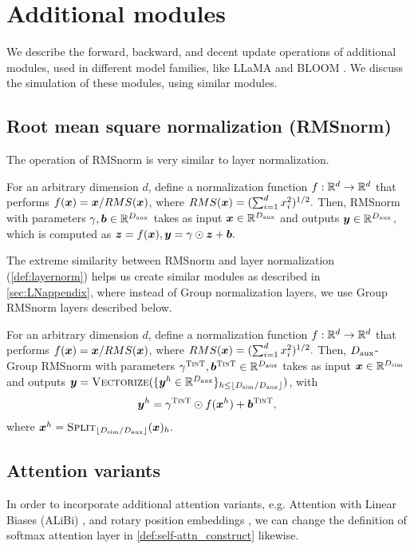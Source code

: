 \section{Additional modules}\label{sec:additional_modules}
We describe the forward, backward, and decent update operations of additional modules, used in different model families, like LLaMA \cite{touvron2023llama} and BLOOM \cite{scao2022bloom}. We discuss the simulation of these modules, using similar \simulator{} modules.


\subsection{Root mean square normalization (RMSnorm)} 
The operation of RMSnorm \cite{zhang2019root} is very similar to layer normalization.
\begin{definition}[RMSnorm]\label{def:rmsnorm}
    For an arbitrary dimension $d$, define a normalization function $f:\mathbb{R}^d\to\mathbb{R}^d$ that performs $f({\bm{x}}) = {\bm{x}} / RMS({\bm{x}})$, where $RMS({\bm{x}}) = (\sum_{i=1}^{d} x_i^2)^{1/2}.$ Then, RMSnorm with parameters $\mathbf{\gamma}, {\bm{b}} \in \mathbb{R}^{D_{\text{aux}}}$ takes as input  ${\bm{x}} \in \mathbb{R}^{D_{\text{aux}}}$ and outputs ${\bm{y}}\in\mathbb{R}^{D_{\text{aux}}}$, which is computed as ${\bm{z}} = f({\bm{x}}), {\bm{y}} = \mathbf{\gamma} \odot {\bm{z}} + {\bm{b}}.$
\end{definition}

The extreme similarity between RMSnorm and layer normalization (\cref{def:layernorm}) helps us create similar \simulator{} modules as described in \cref{sec:LNappendix}, where instead of Group normalization layers, we use Group RMSnorm layers described below.  


\begin{definition}\label{def:group_rmsnorm}
    For an arbitrary dimension $d$, define a normalization function $f:\mathbb{R}^d\to\mathbb{R}^d$ that performs $f({\bm{x}}) = {\bm{x}} / RMS({\bm{x}})$, where $RMS({\bm{x}}) = (\sum_{i=1}^{d} x_i^2)^{1/2}.$ Then, $D_{\text{aux}}$-Group RMSnorm with parameters ${\mathbf{\gamma}}^{\textsc{TinT}}, {{\bm{b}}}^{\textsc{TinT}} \in \mathbb{R}^{D_{\text{aux}}}$ takes as input  ${\bm{x}} \in \mathbb{R}^{D_{\text{sim}}}$ and outputs ${\bm{y}} = \textsc{Vectorize}( \{ {\bm{y}}^h \in \mathbb{R}^{D_{\text{aux}}} \}_{h \le \lfloor D_{\text{sim}}/D_{\text{aux}} \rfloor} )$, with
    \begin{align*}
        {\bm{y}}^h = {\mathbf{\gamma}}^{\textsc{TinT}} \odot f({\bm{x}}^h) + {{\bm{b}}}^{\textsc{TinT}},
    \end{align*}
    where ${\bm{x}}^h = \textsc{Split}_{\lfloor D_{\text{sim}}/D_{\text{aux}} \rfloor} ( {\bm{x}} )_h.$
\end{definition}


\subsection{Attention variants}
In order to incorporate additional attention variants, e.g. Attention with Linear Biases (ALiBi) \cite{press2021train}, and rotary position embeddings \cite{su2021roformer}, we can change the definition of softmax attention layer in \cref{def:self-attn_construct} likewise. 

